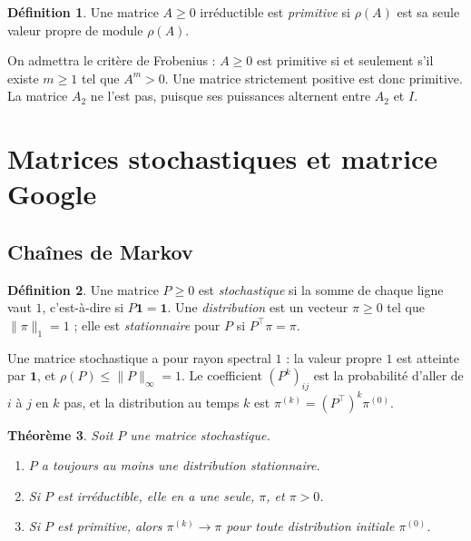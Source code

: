 \documentclass[11pt,a4paper]{article}
\theoremstyle{plain}
\newtheorem{theoreme}{Théorème}[section]
\theoremstyle{definition}
\newtheorem{definition}[theoreme]{Définition}
\theoremstyle{remark}
\newcommand{\un}{\mathbf{1}}
\begin{document}
\begin{definition}
Une matrice $A\geq0$ irréductible est \emph{primitive} si $\rho(A)$ est sa seule valeur propre de module $\rho(A)$.
\end{definition}

On admettra le critère de Frobenius : $A\geq0$ est primitive si et seulement s'il existe $m\geq1$ tel que $A^m>0$. Une matrice strictement positive est donc primitive. La matrice $A_2$ ne l'est pas, puisque ses puissances alternent entre $A_2$ et $I$.

\section{Matrices stochastiques et matrice Google}

\subsection{Chaînes de Markov}

\begin{definition}
Une matrice $P\geq0$ est \emph{stochastique} si la somme de chaque ligne vaut $1$, c'est-à-dire si $P\un=\un$. Une \emph{distribution} est un vecteur $\pi\geq0$ tel que $\|\pi\|_1=1$ ; elle est \emph{stationnaire} pour $P$ si $P^\top\pi=\pi$.
\end{definition}

Une matrice stochastique a pour rayon spectral $1$ : la valeur propre $1$ est atteinte par $\un$, et $\rho(P)\leq\|P\|_\infty=1$. Le coefficient $(P^k)_{ij}$ est la probabilité d'aller de $i$ à $j$ en $k$ pas, et la distribution au temps $k$ est $\pi^{(k)}=(P^\top)^k\pi^{(0)}$.

\begin{theoreme}\label{thm:markov}
Soit $P$ une matrice stochastique.
\begin{enumerate}[nosep]
\item $P$ a toujours au moins une distribution stationnaire.
\item Si $P$ est irréductible, elle en a une seule, $\pi$, et $\pi>0$.
\item Si $P$ est primitive, alors $\pi^{(k)}\to\pi$ pour toute distribution initiale $\pi^{(0)}$.
\end{enumerate}
\end{theoreme}
\end{document}
